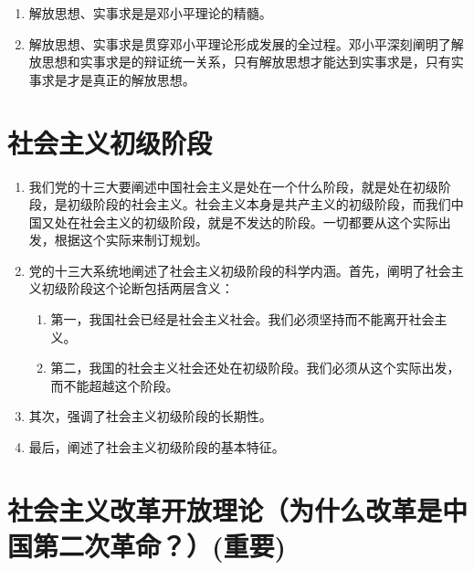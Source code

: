 \documentclass[12pt, a4paper, oneside]{ctexbook}
\begin{document}
\begin{enumerate}
\item 解放思想、实事求是是邓小平理论的精髓。

\item 解放思想、实事求是贯穿邓小平理论形成发展的全过程。邓小平深刻阐明了解放思想和实事求是的辩证统一关系，只有解放思想才能达到实事求是，只有实事求是才是真正的解放思想。
\end{enumerate}

\section{社会主义初级阶段}

\begin{enumerate}
\item 我们党的十三大要阐述中国社会主义是处在一个什么阶段，就是处在初级阶段，是初级阶段的社会主义。社会主义本身是共产主义的初级阶段，而我们中国又处在社会主义的初级阶段，就是不发达的阶段。一切都要从这个实际出发，根据这个实际来制订规划。

\item 党的十三大系统地阐述了社会主义初级阶段的科学内涵。首先，阐明了社会主义初级阶段这个论断包括两层含义：

\begin{enumerate}[label=(\arabic*)]
\item 第一，我国社会已经是社会主义社会。我们必须坚持而不能离开社会主义。

\item 第二，我国的社会主义社会还处在初级阶段。我们必须从这个实际出发，而不能超越这个阶段。
\end{enumerate}

\item 其次，强调了社会主义初级阶段的长期性。

\item 最后，阐述了社会主义初级阶段的基本特征。
\end{enumerate}

\section{社会主义改革开放理论（为什么改革是中国第二次革命？）(重要)}
\end{document}
